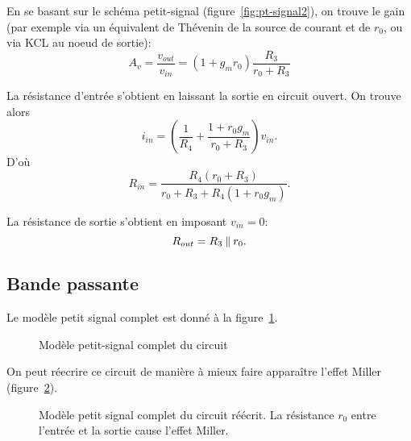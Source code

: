 \documentclass[frenchb,DIV=14]{scrartcl}
\begin{document}
En se basant sur le schéma petit-signal (figure~\ref{fig:pt-signal2}), on
trouve le gain (par exemple via un équivalent de Thévenin de la source de courant
et de $r_0$, ou via KCL au noeud de sortie):
\[A_v = \frac{v_{out}}{v_{in}} = (1+g_m r_0) \frac{R_3}{r_0 + R_3}\]

La résistance d'entrée s'obtient en laissant la sortie en circuit ouvert.
On trouve alors
\[i_{in} = \left(\frac{1}{R_4} + \frac{1+r_0 g_m}{r_0 + R_3}\right) v_{in}.\]
D'où
\[R_{in} = \frac{R_4 (r_0 + R_3)}{r_0 + R_3 + R_4 (1+r_0 g_m)}.\]

La résistance de sortie s'obtient en imposant $v_{in} = 0$:
\[R_{out} = R_3 \mathbin{\|} r_0.\]

\subsection*{Bande passante}
Le modèle petit signal complet est donné à la figure~\ref{fig:pt-signal3}.

\begin{figure}[h]
    \centering
    \caption{Modèle petit-signal complet du circuit}
    \label{fig:pt-signal3}
\end{figure}

On peut réecrire ce circuit de manière à mieux faire apparaître l'effet Miller
(figure~\ref{fig:pt-signal4}).

\begin{figure}[h]
	\centering
	\caption{Modèle petit signal complet du circuit réécrit. La résistance $r_0$
	entre l'entrée et la sortie cause l'effet Miller.}
	\label{fig:pt-signal4}
\end{figure}
\end{document}
